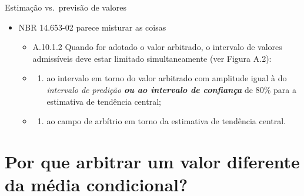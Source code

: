 \documentclass[9pt,ignorenonframetext,aspectratio=169]{beamer}
\providecommand{\tightlist}{%
  \setlength{\itemsep}{0pt}\setlength{\parskip}{0pt}}
\begin{document}
\begin{frame}{Estimação vs.~previsão de valores}
\protect\hypertarget{estimauxe7uxe3o-vs.-previsuxe3o-de-valores-2}{}

\begin{itemize}[<+->]
\tightlist
\item
  NBR 14.653-02 \autocite{NBR1465302} parece misturar as coisas

  \begin{itemize}[<+->]
  \item
    A.10.1.2 Quando for adotado o valor arbitrado, o intervalo de
    valores admissíveis deve estar limitado simultaneamente (ver Figura
    A.2):\\
  \item
    \begin{enumerate}[<+->]
    [a)]
    \tightlist
    \item
      ao intervalo em torno do valor arbitrado com amplitude igual à do
      \emph{intervalo de predição \textbf{ou ao intervalo de confiança}}
      de 80\% para a estimativa de tendência central;
    \end{enumerate}
  \item
    \begin{enumerate}[<+->]
    [a)]
    \setcounter{enumi}{1}
    \tightlist
    \item
      ao campo de arbítrio em torno da estimativa de tendência central.
    \end{enumerate}
  \end{itemize}
\end{itemize}

\end{frame}

\hypertarget{por-que-arbitrar-um-valor-diferente-da-muxe9dia-condicional}{%
\section{Por que arbitrar um valor diferente da média
condicional?}\label{por-que-arbitrar-um-valor-diferente-da-muxe9dia-condicional}}
\end{document}
